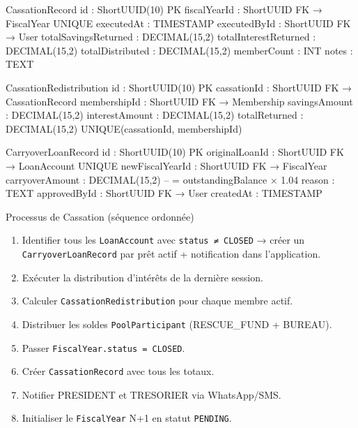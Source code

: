 \documentclass[12pt, a4paper]{report}
\begin{document}
\begin{codeBox}
CassationRecord {
  id                    : ShortUUID(10)  PK
  fiscalYearId          : ShortUUID      FK → FiscalYear  UNIQUE
  executedAt            : TIMESTAMP
  executedById          : ShortUUID      FK → User
  totalSavingsReturned  : DECIMAL(15,2)
  totalInterestReturned : DECIMAL(15,2)
  totalDistributed      : DECIMAL(15,2)
  memberCount           : INT
  notes                 : TEXT
}

CassationRedistribution {
  id              : ShortUUID(10)  PK
  cassationId     : ShortUUID      FK → CassationRecord
  membershipId    : ShortUUID      FK → Membership
  savingsAmount   : DECIMAL(15,2)
  interestAmount  : DECIMAL(15,2)
  totalReturned   : DECIMAL(15,2)
  UNIQUE(cassationId, membershipId)
}

CarryoverLoanRecord {
  id               : ShortUUID(10)  PK
  originalLoanId   : ShortUUID      FK → LoanAccount  UNIQUE
  newFiscalYearId  : ShortUUID      FK → FiscalYear
  carryoverAmount  : DECIMAL(15,2)  -- = outstandingBalance × 1.04
  reason           : TEXT
  approvedById     : ShortUUID      FK → User
  createdAt        : TIMESTAMP
}
\end{codeBox}

\begin{ruleBox}{Processus de Cassation (séquence ordonnée)}
\begin{enumerate}
  \item Identifier tous les \texttt{LoanAccount} avec \texttt{status ≠ CLOSED}
        → créer un \texttt{CarryoverLoanRecord} par prêt actif + notification dans l'application.
  \item Exécuter la distribution d'intérêts de la dernière session.
  \item Calculer \texttt{CassationRedistribution} pour chaque membre actif.
  \item Distribuer les soldes \texttt{PoolParticipant} (RESCUE\_FUND + BUREAU).
  \item Passer \texttt{FiscalYear.status = CLOSED}.
  \item Créer \texttt{CassationRecord} avec tous les totaux.
  \item Notifier PRESIDENT et TRESORIER via WhatsApp/SMS.
  \item Initialiser le \texttt{FiscalYear} N+1 en statut \texttt{PENDING}.
\end{enumerate}
\end{ruleBox}

\end{document}
